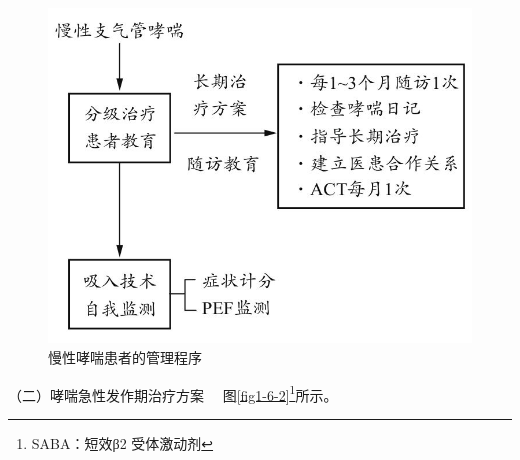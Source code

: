 \begin{figure}[!htbp]
 \centering
 \includegraphics{./images/Image00007.jpg}
 \captionsetup{justification=centering}
 \caption{慢性哮喘患者的管理程序}
 \label{fig1-6-1}
  \end{figure} 

{（二）哮喘急性发作期治疗方案} 　图\ref{fig1-6-2}\footnote{SABA：短效β{2} 受体激动剂}所示。

